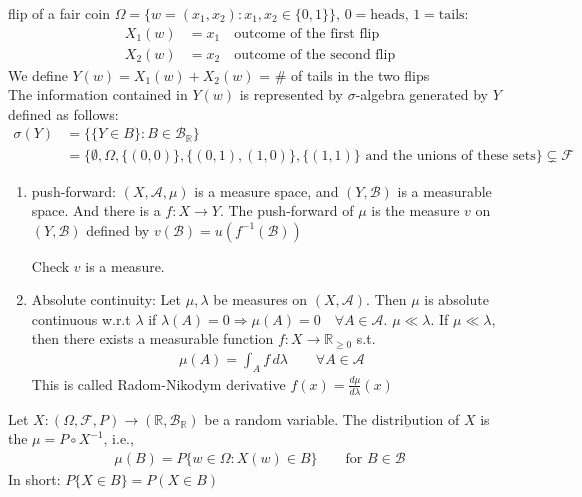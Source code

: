 \documentclass[11pt]{article}
\begin{document}
\begin{example}
    flip of a fair coin $\Omega = \{ w = (x_1,x_2): x_1,x_2 \in \{0,1\}\}$, $0 = \text{heads}, \, 1=\text{tails}$:
    \begin{align*}
        X_1(w) &= x_1  \quad \text{outcome of the first flip}\\
        X_2(w) &= x_2  \quad \text{outcome of the second flip}
    \end{align*}
    We define $Y(w) = X_1(w) + X_2(w)$ = \# of tails in the two flips \\
    The information contained in $Y(w)$ is represented by $\sigma$-algebra generated by $Y$ defined as follows:
    \begin{align*}
        \sigma(Y) &= \{\{Y \in B\}: B \in \mathcal{B}_{\mathbb{R}}\}\\
        &= \Big\{\emptyset, \Omega, \{(0,0)\}, \{(0,1),(1,0) \} , \{(1,1)\} \text{ and the unions of these sets}\Big\} \subsetneq \mathcal{F}
    \end{align*}
\end{example}


\begin{enumerate}
    \item push-forward: $(X, \mathcal{A}, \mu)$ is a measure space, 
    and $(Y, \mathcal{B})$ is a measurable space. And there is a $f: X \to Y$.
    The push-forward of $\mu$ is the measure $v$ on $(Y, \mathcal{B})$ defined by $v(\mathcal{B}) =
    u(f^{-1}(\mathcal{B}))$
    \begin{exercise}
        Check $v$ is a measure.
    \end{exercise}

    \item Absolute continuity: Let $\mu, \lambda$ be measures on $(X, \mathcal{A})$. Then $\mu$ is absolute
    continuous w.r.t $\lambda$ if $\lambda(A) = 0 \Longrightarrow \mu(A) = 0 \quad \forall  A \in \mathcal{A}$.
    \remark $\mu \ll \lambda$. If $\mu \ll \lambda$, then there exists a measurable function 
    $f: X \to \mathbb{R}_{\ge 0}$ s.t. 
    \begin{align*}
        \mu(A) = \int_{A} f \, d \lambda \qquad \forall A \in \mathcal{A}
    \end{align*}
    This is called Radom-Nikodym derivative $f(x) = \frac{d \mu}{d \lambda}(x)$
\end{enumerate}

\begin{definition}
    Let $X: (\Omega, \mathcal{F}, P) \to (\mathbb{R}, \mathcal{B}_{\mathbb{R}})$ be a random variable.
    The $\underline{\text{distribution}}$ of $X$ is the $\mu = P \circ X^{-1}$, i.e.,
    \begin{align*}
        \mu (B) = P\{w \in \Omega: X(w) \in B\} \qquad \text{for } B \in \mathcal{B}
    \end{align*}
    In short: $P\{X \in B\} = P(X \in B)$
\end{definition}
\end{document}
